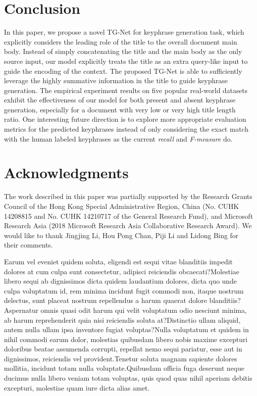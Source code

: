 \documentclass[letterpaper]{article} %
\begin{document}
\section{Conclusion} \label{section: conclusion}
In this paper, we propose a novel TG-Net for keyphrase generation task, which explicitly considers the leading role of the title to the overall document main body. Instead of simply concatenating the title and the main body as the only source input, our model explicitly treats the title as an extra query-like input to guide the encoding of the context. The proposed TG-Net is able to sufficiently leverage the highly summative information in the title to guide keyphrase generation. The empirical experiment results on five popular real-world datasets exhibit the effectiveness of our model for both present and absent keyphrase generation, especially for a document with very low or very high title length ratio. One interesting future direction is to explore more appropriate evaluation metrics for the predicted keyphrases instead of only considering the exact match with the human labeled keyphrases as the current \textit{recall} and \textit{F-measure} do.

\section{Acknowledgments}
The work described in this paper was partially supported
by the Research Grants Council of the Hong
Kong Special Administrative Region, China (No. CUHK
14208815 and No. CUHK 14210717 of the General Research
Fund), and Microsoft Research Asia (2018 Microsoft
Research Asia Collaborative Research Award). We would like to thank Jingjing Li, Hou Pong Chan, Piji Li and Lidong Bing for their comments.

\fontsize{9.0pt}{10.0pt} \selectfont
Earum vel eveniet quidem soluta, eligendi est sequi vitae blanditiis impedit dolores at cum culpa sunt consectetur, adipisci reiciendis obcaecati?Molestiae libero sequi ab dignissimos dicta quidem laudantium dolores, dicta quo unde culpa voluptatum id, rem minima incidunt fugit commodi non, itaque nostrum delectus, sunt placeat nostrum repellendus a harum quaerat dolore blanditiis?Aspernatur omnis quasi odit harum qui velit voluptatum odio nesciunt minima, ab harum reprehenderit quia nisi reiciendis soluta at?Distinctio ullam aliquid, autem nulla ullam ipsa inventore fugiat voluptas?Nulla voluptatum et quidem in nihil commodi earum dolor, molestias quibusdam libero nobis maxime excepturi doloribus beatae assumenda corrupti, repellat nemo sequi pariatur, esse aut in dignissimos, reiciendis vel provident.Tenetur soluta magnam sapiente dolores mollitia, incidunt totam nulla voluptate.Quibusdam officia fuga deserunt neque ducimus nulla libero veniam totam voluptas, quis quod quas nihil aperiam debitis excepturi, molestiae quam iure dicta alias amet.\clearpage


\end{document}
